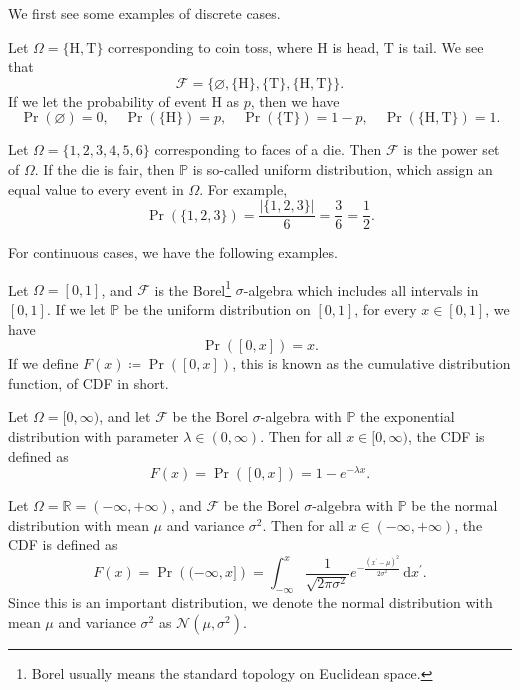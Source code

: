 We first see some examples of discrete cases.
\begin{eg}
	Let \(\Omega = \{\mathrm{H}, \mathrm{T}\}\) corresponding to coin toss, where \(\mathrm{H}\) is head, \(\mathrm{T}\) is tail. We see that
	\[
		\mathcal{F} = \{\varnothing , \{\mathrm{H} \}, \{\mathrm{T} \}, \{\mathrm{H} , \mathrm{T} \}\}.
	\]
	If we let the probability of event \(\mathrm{H} \) as \(p\), then we have
	\[
		\Pr(\varnothing ) = 0,\quad \Pr(\{\mathrm{H}\}) = p,\quad \Pr(\{\mathrm{T} \}) = 1 - p,\quad \Pr(\{\mathrm{H} , \mathrm{T} \}) = 1.
	\]
\end{eg}

\begin{eg}
	Let \(\Omega = \{1, 2, 3, 4, 5, 6\}\) corresponding to faces of a die. Then \(\mathcal{F} \) is the power set of \(\Omega \). If the die is fair, then \(\mathbb{P} \) is so-called uniform distribution, which assign an equal value to every event in \(\Omega \). For example,
	\[
		\Pr(\{1, 2, 3\}) = \frac{\left\vert \{1, 2, 3\} \right\vert }{6} = \frac{3}{6} = \frac{1}{2}.
	\]
\end{eg}

For continuous cases, we have the following examples.
\begin{eg}
	Let \(\Omega = [0, 1]\), and \(\mathcal{F}\) is the Borel\footnote{Borel usually means the standard topology on Euclidean space.} \(\sigma \)-algebra which includes all intervals in \([0, 1]\). If we let \(\mathbb{P} \) be the uniform distribution on \([0, 1]\), for every \(x\in [0, 1]\), we have
	\[
		\Pr([0, x]) = x.
	\]
	If we define \(F(x)\coloneqq \Pr([0, x]) \), this is known as the cumulative distribution function, of CDF in short.
\end{eg}

\begin{eg}
	Let \(\Omega = [0, \infty )\), and let \(\mathcal{F} \) be the Borel \(\sigma \)-algebra with \(\mathbb{P} \) the exponential distribution with parameter \(\lambda \in (0, \infty )\). Then for all \(x\in [0, \infty )\), the CDF is defined as
	\[
		F(x) = \Pr([0, x]) = 1 - e^{-\lambda x}.
	\]
\end{eg}

\begin{eg}
	Let \(\Omega = \mathbb{R} = (-\infty , +\infty )\), and \(\mathcal{F}\) be the Borel \(\sigma\)-algebra with \(\mathbb{P}\) be the normal distribution with mean \(\mu \) and variance \(\sigma ^{2} \). Then for all \(x\in (-\infty , +\infty )\), the CDF is defined as
	\[
		F(x) = \Pr\left( (-\infty , x] \right)  = \int_{-\infty}^{x} \frac{1}{\sqrt{2\pi \sigma ^{2} } } e^{- \frac{(x^\prime  - \mu )^{2} }{2 \sigma ^{2} }} \,\mathrm{d}x^\prime.
	\]
	Since this is an important distribution, we denote the normal distribution with mean \(\mu\) and variance \(\sigma ^{2} \) as \(\mathcal{N} (\mu , \sigma ^{2} )\).
\end{eg}

